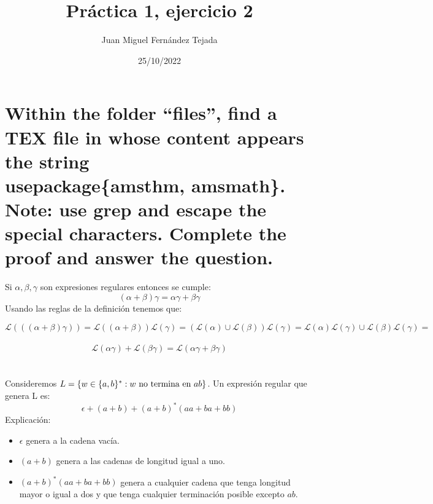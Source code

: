 \documentclass[11pt]{article}
\title{\textbf{Práctica 1, ejercicio 2}}
\author{Juan Miguel Fernández Tejada}
\date{25/10/2022}
\begin{document}
\maketitle
\thispagestyle{empty}

\section{Within the folder “files”, find a TEX file in whose content appears the string
\\usepackage\{amsthm, amsmath\}. Note: use grep and escape the special
characters. Complete the proof and answer the question.}
Si $\alpha,\beta,\gamma$ son expresiones regulares entonces se cumple:
  \begin{equation}
  (\alpha+\beta)\gamma=\alpha\gamma+\beta\gamma
  \end{equation}
Usando las reglas de la definición tenemos que:

$$\mathcal{L}(((\alpha+\beta)\gamma))=\mathcal{L}((\alpha+\beta))\mathcal{L}(\gamma)=(\mathcal{L}(\alpha)\cup \mathcal{L}(\beta))\mathcal{L}(\gamma)=\mathcal{L}(\alpha)\mathcal{L}(\gamma)\cup \mathcal{L}(\beta)\mathcal{L}(\gamma)=$$\\
$$\mathcal{L}(\alpha\gamma)+\mathcal{L}(\beta\gamma)=\mathcal{L}(\alpha\gamma+\beta\gamma)$$\\\\
Consideremos $L=\{w\in \{a,b\}^* : w \textnormal{ no termina en } ab\}$. Un expresión regular que genera L es: \\
\[\epsilon + (a + b) + (a + b)^*(aa + ba + bb)\]
Explicación:
\begin{itemize}
\item $\epsilon$ genera a la cadena vacía.
\item $(a + b)$ genera a las cadenas de longitud igual a uno.
\item $(a + b)^*(aa + ba + bb)$ genera a cualquier cadena que tenga longitud mayor o igual a dos y que tenga cualquier terminación posible excepto $ab$.
\end{itemize}
\end{document}
